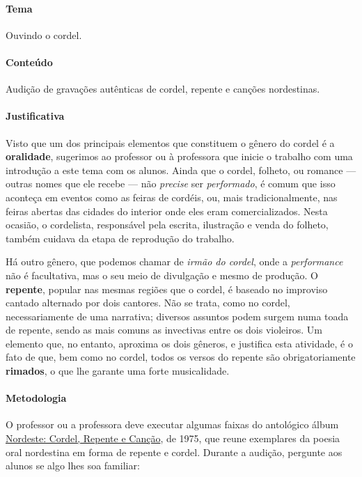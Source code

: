 \documentclass[11pt]{extarticle}
\begin{document}
\paragraph{Tema} Ouvindo o cordel.

\paragraph{Conteúdo} Audição de gravações autênticas de cordel, repente e canções
nordestinas.

\paragraph{Justificativa} Visto que um dos principais elementos que constituem o gênero do cordel é a 
\textbf{oralidade}, sugerimos ao professor ou à professora que inicie o 
trabalho com uma introdução a este tema com os alunos. 
Ainda que o cordel, folheto, ou romance --- outras nomes que ele recebe --- 
não \textit{precise} ser \textit{performado}, é comum que isso aconteça
em eventos como as feiras de cordéis, ou, mais tradicionalmente, 
nas feiras abertas das cidades do interior onde eles eram comercializados.
Nesta ocasião, o cordelista, responsável pela escrita, ilustração e venda
do folheto, também cuidava da etapa de reprodução do trabalho.

Há outro gênero, que podemos chamar de \textit{irmão do cordel},
onde a \textit{performance} não é facultativa, mas o seu meio de 
divulgação e mesmo de produção. 
O \textbf{repente}, popular nas mesmas regiões que o cordel, é 
baseado no improviso cantado alternado por dois cantores. 
Não se trata, como no cordel, necessariamente de uma narrativa;
diversos assuntos podem surgem numa toada de repente, sendo as mais comuns
as invectivas entre os dois violeiros. 
Um elemento que, no entanto, aproxima os dois gêneros, e justifica esta atividade,
é o fato de que, bem como no cordel, todos os versos do repente são
obrigatoriamente \textbf{rimados}, o que lhe garante uma forte musicalidade. 

\paragraph{Metodologia} O professor ou a professora deve executar algumas faixas 
do antológico álbum \href{https://www.youtube.com/watch?v=wS6jzcZcc6U}{Nordeste: Cordel, 
Repente e Canção}, de 1975, que
reune exemplares da poesia oral nordestina em forma de repente e cordel. 
Durante a audição, pergunte aos alunos se algo lhes soa familiar:
\end{document}
